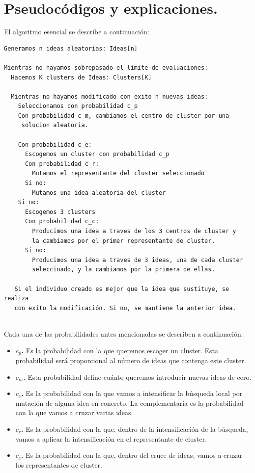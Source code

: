 \newpage

\section{Pseudocódigos y explicaciones.}
El algoritmo esencial se describe a continuación:\\

\noindent\hrulefill

\begin{lstlisting}
Generamos n ideas aleatorias: Ideas[n]

Mientras no hayamos sobrepasado el limite de evaluaciones:
  Hacemos K clusters de Ideas: Clusters[K]
  
  Mientras no hayamos modificado con exito n nuevas ideas:
    Seleccionamos con probabilidad c_p
    Con probabilidad c_m, cambiamos el centro de cluster por una 
     solucion aleatoria.
  
    Con probabilidad c_e:
      Escogemos un cluster con probabilidad c_p
      Con probabilidad c_r:
        Mutamos el representante del cluster seleccionado
      Si no:
        Mutamos una idea aleatoria del cluster
    Si no:
      Escogemos 3 clusters
      Con probabilidad c_c:
        Producimos una idea a traves de los 3 centros de cluster y 
        la cambiamos por el primer representante de cluster.
      Si no:
        Producimos una idea a traves de 3 ideas, una de cada cluster
        seleccinado, y la cambiamos por la primera de ellas.
        
   Si el individuo creado es mejor que la idea que sustituye, se realiza
   con exito la modificación. Si no, se mantiene la anterior idea.
    
\end{lstlisting}

Cada una de las probabilidades antes mencionadas se describen a continuación:\\

\begin{itemize}
	\item \textbf{$c_p$.} Es la probabilidad con la que queremos escoger un cluster. Esta probabilidad será proporcional al número de ideas que contenga este cluster.
	\item \textbf{$c_m$.} Esta probabilidad define cuánto queremos introducir nuevas ideas de cero.
	\item \textbf{$c_e$.} Es la probabilidad con la que vamos a intensificar la búsqueda local por mutación de alguna idea en concreto. La complementaria es la probabilidad con la que vamos a cruzar varias ideas.
	\item \textbf{$c_r$.} Es la probabilidad con la que, dentro de la intensificación de la búsqueda, vamos a aplicar la intensificación en el representante de cluster.
	\item \textbf{$c_c$.} Es la probabilidad con la que, dentro del cruce de ideas, vamos a cruzar los representantes de cluster.
\end{itemize}

